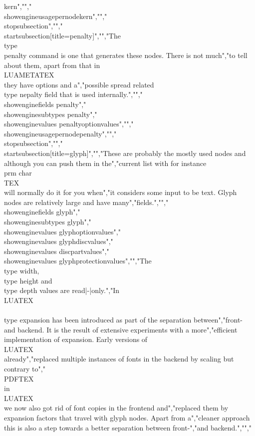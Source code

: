 {kern}","","\\showengineusagepernode{kern}","","\\stopsubsection","","\\startsubsection[title={penalty}]","","The \\type {\\penalty} command is one that generates these nodes. There is not much","to tell about them, apart from that in \\LUAMETATEX\\ they have options and a","possible spread related \\type {nepalty} field that is used internally.","","\\showenginefields   {penalty}","\\showenginesubtypes {penalty}","\\showenginevalues   {penaltyoptionvalues}","","\\showengineusagepernode{penalty}","","\\stopsubsection","","\\startsubsection[title={glyph}]","","These are probably the mostly used nodes and although you can push them in the","current list with for instance \\prm {char} \\TEX\\ will normally do it for you when","it considers some input to be text. Glyph nodes are relatively large and have many","fields.","","\\showenginefields   {glyph}","\\showenginesubtypes {glyph}","\\showenginevalues   {glyphoptionvalues}","\\showenginevalues   {glyphdiscvalues}","\\showenginevalues   {discpartvalues}","\\showenginevalues   {glyphprotectionvalues}","","The \\type {width}, \\type {height} and \\type {depth} values are read|-|only.","In \\LUATEX\\ \\type {expansion} has been introduced as part of the separation between","front- and backend. It is the result of extensive experiments with a more","efficient implementation of expansion. Early versions of \\LUATEX\\ already","replaced multiple instances of fonts in the backend by scaling but contrary to","\\PDFTEX\\ in \\LUATEX\\ we now also got rid of font copies in the frontend and","replaced them by expansion factors that travel with glyph nodes. Apart from a","cleaner approach this is also a step towards a better separation between front-","and backend.","","%